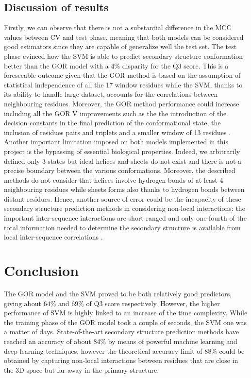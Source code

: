 \documentclass[nocrop]{bioinfo}
\begin{document}
\subsection{Discussion of results} 
Firstly, we can observe that there is not a substantial difference in the MCC values between CV and test phase, meaning that both models can be considered good estimators since they are capable of generalize well the test set. 
The test phase evinced how the SVM is able to predict secondary structure conformation better than the GOR model with a 4\% disparity for the Q3 score.
This is a foreseeable outcome given that the GOR method is based on the assumption of statistical independence of all the 17 window residues while the SVM, thanks to its ability to handle large dataset, accounts for the correlations between neighbouring residues. Moreover, the GOR method performance could increase including all the GOR V improvements such as the the introduction of the decision constants in the final prediction of the conformational state, the inclusion of residues pairs and triplets and a smaller window of 13 residues \citep{sen2005gor}. Another important limitation imposed on both models implemented in this project is the bypassing of essential biological properties. Indeed, we arbitrarily defined only 3 states but ideal helices and sheets do not exist and there is not a precise boundary between the various conformations. Moreover, the described methods do not consider that helices involve hydrogen bonds of at least 4 neighbouring residues while sheets forms also thanks to hydrogen bonds between distant residues. Hence, another source of error could be the incapacity of these secondary structure prediction methods in considering non-local interactions: the important inter-sequence interactions are short ranged and only one-fourth of the total information needed to determine the secondary structure is available from local inter-sequence correlations \citep{crooks2004protein}.
\section{Conclusion}
The GOR model and the SVM proved to be both relatively good predictors, giving about $64\%$ and $69\%$ of Q3 score respectively. However, the higher performance of SVM is highly linked to an increase of the time complexity. While the training phase of the GOR model took a couple of seconds, the SVM one was a matter of days. State-of-the-art secondary structure prediction methods have reached an accuracy of about 84\% by means of powerful machine learning and deep learning techniques, however the theoretical accuracy limit of 88\% \citep{rost2001protein} could be obtained by capturing non-local interactions between residues that are close in the 3D space but far away in the primary structure. 


\end{document}
